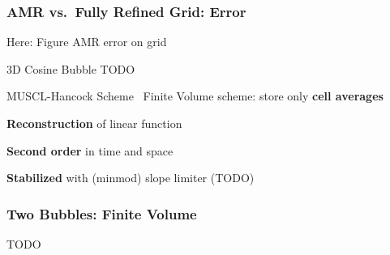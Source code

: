 \documentclass[aspectratio=169]{beamer}
\begin{document}
\begin{frame}
  \frametitle{AMR vs.\ Fully Refined Grid: Error}

  Here: Figure AMR error on grid
\end{frame}

\begin{frame}{3D Cosine Bubble}
  TODO
\end{frame}

\begin{frame}{MUSCL-Hancock Scheme~}
  Finite Volume scheme: store only \textbf{cell averages}

  \textbf{Reconstruction} of linear function

  \textbf{Second order} in time and space

  \textbf{Stabilized} with (minmod) slope limiter (TODO)
\end{frame}

\begin{frame}
  \frametitle{Two Bubbles: Finite Volume}
 TODO  
\end{frame}
\end{document}
